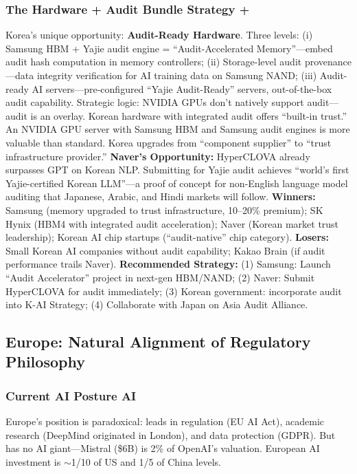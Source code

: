 \documentclass[11pt,a4paper]{article}
\theoremstyle{definition}
\theoremstyle{remark}
\begin{document}
\subsubsection{The Hardware + Audit Bundle Strategy +}
Korea's unique opportunity: \textbf{Audit-Ready Hardware}. Three levels: (i) Samsung HBM + Yajie audit engine = ``Audit-Accelerated Memory''---embed audit hash computation in memory controllers; (ii) Storage-level audit provenance---data integrity verification for AI training data on Samsung NAND; (iii) Audit-ready AI servers---pre-configured ``Yajie Audit-Ready'' servers, out-of-the-box audit capability.
Strategic logic: NVIDIA GPUs don't natively support audit---audit is an overlay. Korean hardware with integrated audit offers ``built-in trust.'' An NVIDIA GPU server with Samsung HBM and Samsung audit engines is more valuable than standard. Korea upgrades from ``component supplier'' to ``trust infrastructure provider.''
\textbf{Naver's Opportunity:} HyperCLOVA already surpasses GPT on Korean NLP. Submitting for Yajie audit achieves ``world's first Yajie-certified Korean LLM''---a proof of concept for non-English language model auditing that Japanese, Arabic, and Hindi markets will follow.
\textbf{Winners:} Samsung (memory upgraded to trust infrastructure, 10--20\% premium); SK Hynix (HBM4 with integrated audit acceleration); Naver (Korean market trust leadership); Korean AI chip startups (``audit-native'' chip category).
\textbf{Losers:} Small Korean AI companies without audit capability; Kakao Brain (if audit performance trails Naver).
\textbf{Recommended Strategy:} (1) Samsung: Launch ``Audit Accelerator'' project in next-gen HBM/NAND; (2) Naver: Submit HyperCLOVA for audit immediately; (3) Korean government: incorporate audit into K-AI Strategy; (4) Collaborate with Japan on Asia Audit Alliance.
\subsection{Europe: Natural Alignment of Regulatory Philosophy}
\label{sec:europe}
\subsubsection{Current AI Posture AI}
Europe's position is paradoxical: leads in regulation (EU AI Act), academic research (DeepMind originated in London), and data protection (GDPR). But has no AI giant---Mistral (\$6B) is 2\% of OpenAI's valuation. European AI investment is $\sim$1/10 of US and 1/5 of China levels.
\end{document}
